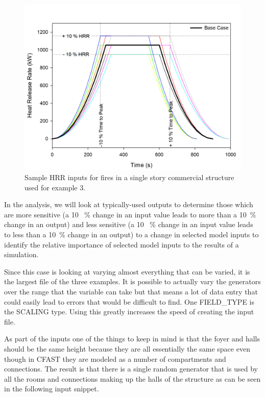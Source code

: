 \documentclass[12pt,twoside]{book}
\begin{document}
\begin{figure}[h!]
\centering
\includegraphics[width=4.5in]{FIGURES/Sensitivity_HRR_Samples.jpg}
\caption{Sample HRR inputs for fires in a single story commercial structure used for example 3.}
\label{Sensitivity_fires}
\end{figure}

In the analysis, we will look at typically-used outputs to determine those which are more sensitive (a 10 ~\% change in an input value leads to more than a 10~\% change in an output) and less sensitive (a 10 ~\% change in an input value leads to less than a 10~\% change in an output) to a change in selected model inputs to identify the relative importance of selected model inputs to the results of a simulation.

Since this case is looking at varying almost everything that can be varied, it is the largest file of the three examples. It is possible to actually vary the generators over the range that the variable can take but that means a lot of data entry that could easily lead to errors that would be difficult to find. One FIELD\_TYPE is the SCALING type. Using this greatly increases the speed of creating the input file.

As part of the inputs one of the things to keep in mind is that the foyer and halls should be the same height because they are all essentially the same space even though in CFAST they are modeled as a number of compartments and connections. The result is that there is a single random generator that is used by all the rooms and connections making up the halls of the structure as can be seen in the following input snippet.
\end{document}

